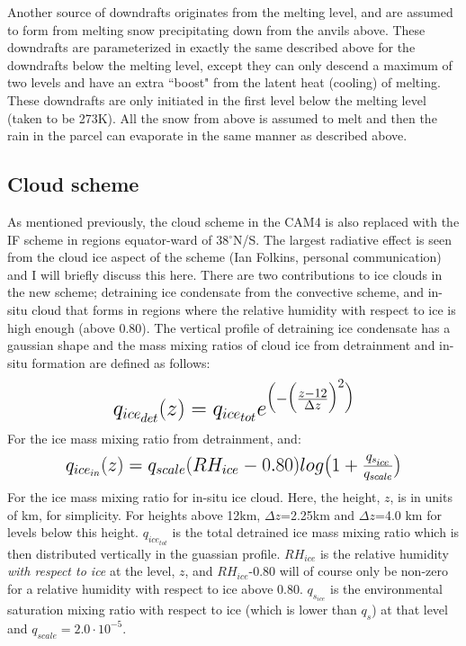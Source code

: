 \documentclass[letterpaper,12pt,titlepage,oneside,final]{book}
\begin{document}
Another source of downdrafts originates from the melting level, and are assumed to form from melting snow precipitating down from the anvils above. These downdrafts are parameterized in exactly the same described above for the downdrafts below the melting level, except they can only descend a maximum of two levels and have an extra ``boost" from the latent heat (cooling) of melting. These downdrafts are only initiated in the first level below the melting level (taken to be 273K). All the snow from above is assumed to melt and then the rain in the parcel can evaporate in the same manner as described above.
\subsection{Cloud scheme}
As mentioned previously, the cloud scheme in the CAM4 is also replaced with the IF scheme in regions equator-ward of 38$^{\circ}$N/S. The largest radiative effect is seen from the cloud ice aspect of the scheme (Ian Folkins, personal communication) and I will briefly discuss this here. There are two contributions to ice clouds in the new scheme; detraining ice condensate from the convective scheme, and in-situ cloud that forms in regions where the relative humidity with respect to ice is high enough (above 0.80). The vertical profile of detraining ice condensate has a gaussian shape and the mass mixing ratios of cloud ice from detrainment and in-situ formation are defined as follows:
\begin{align}
\mbox{\fontsize{17.28}{21.6}\selectfont\(
q_{ice_{det}}(z)=q_{ice_{tot}}e^{\big(-\big(\frac{z-12}{\Delta{z}}\big)^{2}\big)}
\)}
\end{align}
For the ice mass mixing ratio from detrainment, and:
\begin{align}
\mbox{\fontsize{15}{21.6}\selectfont\(
q_{ice_{in}}(z)=q_{scale}(RH_{ice}-0.80)log\big(1+\frac{q_{s_{ice}}}{q_{scale}}\big)
\)}
\end{align}
For the ice mass mixing ratio for in-situ ice cloud. Here, the  height, $z$, is in units of km, for simplicity. For heights above 12km, $\Delta{z}$=2.25km and $\Delta{z}$=4.0 km for levels below this height. $q_{ice_{tot}}$ is the total detrained ice mass mixing ratio which is then distributed vertically in the guassian profile. $RH_{ice}$ is the relative humidity \textit{with respect to ice} at the level, $z$, and $RH_{ice}$-0.80 will of course only be non-zero for a relative humidity with respect to ice above 0.80. $q_{s_{ice}}$ is the environmental saturation mixing ratio with respect to ice (which is lower than $q_{s}$) at that level and $q_{scale}=2.0\cdot10^{-5}$. 
\end{document}
